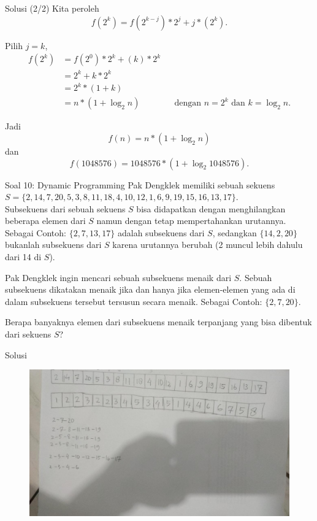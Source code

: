 \documentclass[english,t]{beamer}
\begin{document}
\begin{frame}{Solusi (2/2)}
Kita peroleh
\begin{equation*}
	f(2^k) = f(2^{k-j}) * 2^j + j * (2^k).
\end{equation*}

Pilih $j=k$,
\begin{align*}
	f(2^k) &= f(2^0) * 2^k + (k) * 2^k \\
	       &= 2^k + k * 2^k \\
	       &= 2^k * (1+k) \\
	       &= n * (1 + \log_2 n) && \text{dengan }n=2^k \text{ dan }k=\log_2 n.
\end{align*}

Jadi 
\begin{equation*}
f(n) = n * (1 + \log_2 n)
\end{equation*}
dan
\begin{equation*}
f(1048576) = 1048576 * (1 + \log_2 1048576).
\end{equation*}
\end{frame}

\begin{frame}{Soal 10: Dynamic Programming}
Pak Dengklek memiliki sebuah sekuens $S = \{2, 14, 7, 20, 5, 3, 8, 11, 18, 4, 10, 12, 1, 6, 9, 19, 15, 16, 13, 17\}$. \\
Subsekuens dari sebuah sekuens $S$ bisa didapatkan dengan menghilangkan beberapa elemen dari $S$ namun dengan tetap mempertahankan urutannya. Sebagai Contoh: $\{2, 7, 13, 17\}$ adalah subsekuens dari $S$, sedangkan $\{14, 2, 20\}$ bukanlah subsekuens dari $S$ karena urutannya berubah (2 muncul lebih dahulu dari 14 di $S$).

\bigskip
Pak Dengklek ingin mencari sebuah subsekuens menaik dari $S$. Sebuah subsekuens dikatakan menaik jika dan hanya jika elemen-elemen yang ada di dalam subsekuens tersebut tersusun secara menaik. Sebagai Contoh: $\{2, 7, 20\}$. 

\bigskip
Berapa banyaknya elemen dari subsekuens menaik terpanjang yang bisa dibentuk dari sekuens $S$?
\end{frame}

\begin{frame}{Solusi}
\begin{figure}[!ht]
\centering
\includegraphics[scale=.25]{images/solusi-soal-10}
\end{figure}
\end{frame}
\end{document}
